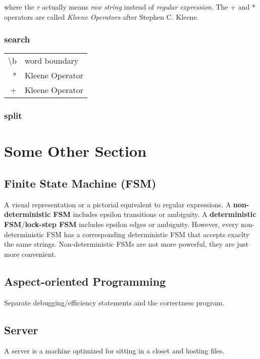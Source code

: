 \documentclass[12pt]{article}
\begin{document}
where the \emph{r} actually means \emph{raw string} instead of \emph{regular expression}. The + and * operators are called \emph{Kleene Operators} after Stephen C. Kleene.

\subsubsection{search}


\begin{tabular}{r | l}
	\textbackslash b & word boundary \\
	* & Kleene Operator \\
	+ & Kleene Operator
\end{tabular}

\subsubsection{split}


\section{Some Other Section}

\subsection*{Finite State Machine (FSM)}
A visual representation or a pictorial equivalent to regular expressions. A \textbf{non-deterministic FSM} includes epsilon transitions or ambiguity. 
A \textbf{deterministic FSM}/\textbf{lock-step FSM} includes  epsilon edges or ambiguity. However, every non-deterministic FSM has a corresponding deterministic FSM that accepts exaclty the same strings. Non-deterministic FSMs are not more powerful, they are just more convenient.

\subsection{Aspect-oriented Programming}
Separate debugging/efficiency statements and the correctness program.

\subsection*{Server}
A server is a machine optimized for sitting in a closet and hosting files.
\end{document}
